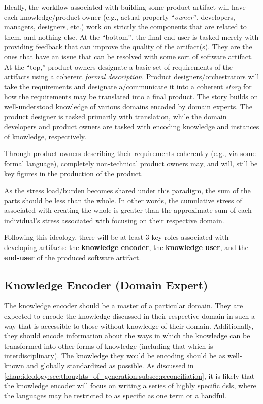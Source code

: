 Ideally, the workflow associated with building some product artifact will have
each knowledge/product owner (e.g., actual property ``\textit{owner}'',
developers, managers, designers, etc.) work on strictly the components that are
related to them, and nothing else. At the ``bottom'', the final end-user is
tasked merely with providing feedback that can improve the quality of the
artifact(s). They are the ones that have an issue that can be resolved with some
sort of software artifact. At the ``top,'' product owners designate a basic set
of requirements of the artifacts using a coherent \textit{formal description}.
Product designers/orchestrators will take the requirements and designate
a/communicate it into a coherent \textit{story} for how the requirements may be
translated into a final product. The story builds on well-understood knowledge
of various domains encoded by domain experts. The product designer is tasked
primarily with translation, while the domain developers and product owners are
tasked with encoding knowledge and instances of knowledge, respectively.

Through product owners describing their requirements coherently (e.g., via some
formal language), completely non-technical product owners may, and will, still
be key figures in the production of the product.

As the stress load/burden becomes shared under this paradigm, the sum of the
parts should be less than the whole. In other words, the cumulative stress of
associated with creating the whole is greater than the approximate sum of each
individual's stress associated with focusing on their respective domain.

Following this ideology, there will be at least 3 key roles associated with
developing artifacts: the \textbf{knowledge encoder}, the \textbf{knowledge
user}, and the \textbf{end-user} of the produced software artifact.

\subsection{Knowledge Encoder (Domain Expert)}
\label{chap:ideology:sec:a_prospective_workflow:subsec:knowledge_encoder}

The knowledge encoder should be a master of a particular domain. They are
expected to encode the knowledge discussed in their respective domain in such a
way that is accessible to those without knowledge of their domain. Additionally,
they should encode information about the ways in which the knowledge can be
transformed into other forms of knowledge (including that which is
interdisciplinary). The knowledge they would be encoding should be as well-known
and globally standardized as possible. As discussed in
\autoref{chap:ideology:sec:thoughts_of_generation:subsec:reconciliation}, it is
likely that the knowledge encoder will focus on writing a series of highly
specific \aclp{dsl}, where the languages may be restricted to as specific as one
term or a handful.

